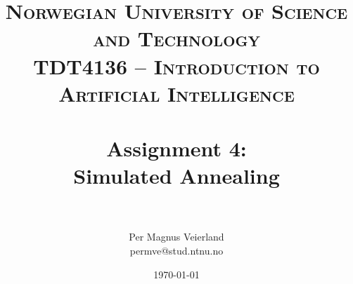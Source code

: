 

\usepackage{float}
\usepackage{pgfplots, pgfplotstable}

\title{	
\normalfont \normalsize 
\textsc{Norwegian University of Science and Technology\\TDT4136 -- Introduction to Artificial Intelligence} \\ [25pt]
\horrule{0.5pt} \\[0.4cm]
\huge Assignment 4:\\ Simulated Annealing\\
\horrule{2pt} \\[0.5cm]
}

\author{Per Magnus Veierland\\permve@stud.ntnu.no}

\date{\normalsize\today}



\maketitle

